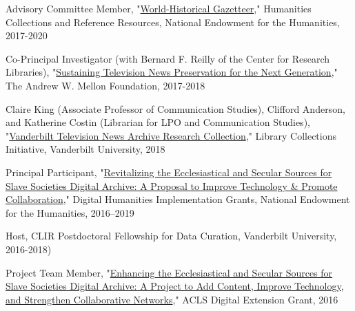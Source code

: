 \documentclass[10pt]{res} %
\begin{document}
\begin{resume}
\begin{hangparas}{.25in}{1}Advisory Committee Member, "\href{https://securegrants.neh.gov/publicquery/main.aspx?f=1\&gn=PW-253719-17}{World-Historical Gazetteer}," Humanities Collections and Reference Resources, National Endowment for the Humanities, 2017-2020\end{hangparas}

\begin{hangparas}{.25in}{1}Co-Principal Investigator (with Bernard F. Reilly of the Center for Research Libraries), "\href{https://news.vanderbilt.edu/2017/09/27/workshop-will-chart-the-future-of-television-news-preservation/}{Sustaining Television News Preservation for the Next Generation}," The Andrew W. Mellon Foundation, 2017-2018\end{hangparas}

\begin{hangparas}{.25in}{1}Claire King (Associate Professor of Communication Studies), Clifford Anderson, and Katherine Costin (Librarian for LPO and Communication Studies), "\href{https://news.vanderbilt.edu/2018/05/16/10-faculty-proposals-funded-through-new-library-collections-initiative}{Vanderbilt Television News Archive Research Collection}," Library Collections Initiative, Vanderbilt University, 2018\end{hangparas}

\begin{hangparas}{.25in}{1}Principal Participant, "\href{https://securegrants.neh.gov/publicquery/main.aspx?f=1\&gn=HK-250720-16}{Revitalizing the Ecclesiastical and Secular Sources for Slave Societies Digital Archive: A Proposal to Improve Technology \& Promote Collaboration}," Digital Humanities Implementation Grants, National Endowment for the Humanities, 2016–2019\end{hangparas}

\begin{hangparas}{.25in}{1}Host, CLIR Postdoctoral Fellowship for Data Curation, Vanderbilt University, 2016-2018)\end{hangparas}

\begin{hangparas}{.25in}{1}Project Team Member, "\href{http://www.acls.org/research/fellow.aspx?cid=f125fd4b-41a1-e211-b90d-000c29a3451a}{Enhancing the Ecclesiastical and Secular Sources for Slave Societies Digital Archive: A Project to Add Content, Improve Technology, and Strengthen Collaborative Networks}," ACLS Digital Extension Grant, 2016\end{hangparas}


\end{resume}
\end{document}
